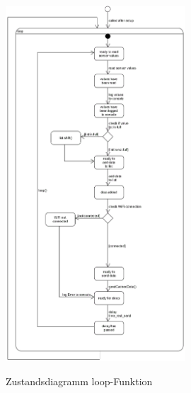\begin{figure}[H]
    \centering
    \begin{minipage}[t]{1\textwidth}
        \caption{Zustandsdiagramm loop-Funktion}
        \includegraphics[width=0.60\textwidth]{img/zustandsdiagramm_nodemcu_loop.png}\\
        \label{fig:zust_diag_nodemcu_loop}
    \end{minipage}
\end{figure}
